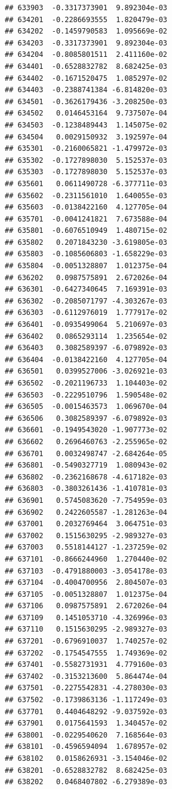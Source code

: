 \documentclass[ignorenonframetext,]{beamer}
\begin{document}
\begin{frame}[fragile]
\begin{verbatim}
## 633903  -0.3317373901  9.892304e-03
## 634201  -0.2286693555  1.820479e-03
## 634202  -0.1459790583  1.095669e-02
## 634203  -0.3317373901  9.892304e-03
## 634204  -0.8085801511  2.411160e-02
## 634401  -0.6528832782  8.682425e-03
## 634402  -0.1671520475  1.085297e-02
## 634403  -0.2388741384 -6.814820e-03
## 634501  -0.3626179436 -3.208250e-03
## 634502   0.0146453164  9.737507e-04
## 634503  -0.1238489443  1.145075e-02
## 634504   0.0029150932  3.192597e-04
## 635301  -0.2160065821 -1.479972e-03
## 635302  -0.1727898030  5.152537e-03
## 635303  -0.1727898030  5.152537e-03
## 635601   0.0611490728 -6.377711e-03
## 635602  -0.2311561010  1.640055e-03
## 635603  -0.0138422160  4.127705e-04
## 635701  -0.0041241821  7.673588e-04
## 635801  -0.6076510949  1.480715e-02
## 635802   0.2071843230 -3.619805e-03
## 635803  -0.1085606803 -1.658229e-03
## 635804  -0.0051328807  1.012375e-04
## 636202   0.0987575891  2.672026e-04
## 636301  -0.6427340645  7.169391e-03
## 636302  -0.2085071797 -4.303267e-03
## 636303  -0.6112976019  1.777917e-02
## 636401  -0.0935499064  5.210697e-03
## 636402   0.0865293114  1.235654e-02
## 636403   0.3082589397 -6.079892e-03
## 636404  -0.0138422160  4.127705e-04
## 636501   0.0399527006 -3.026921e-03
## 636502  -0.2021196733  1.104403e-02
## 636503  -0.2229510796  1.590548e-02
## 636505  -0.0015463573  1.069670e-04
## 636506   0.3082589397 -6.079892e-03
## 636601  -0.1949543020 -1.907773e-02
## 636602   0.2696460763 -2.255965e-02
## 636701   0.0032498747 -2.684264e-05
## 636801  -0.5490327719  1.080943e-02
## 636802  -0.2362168678 -4.617182e-03
## 636803  -0.3803261436 -1.410781e-03
## 636901   0.5745083620 -7.754959e-03
## 636902   0.2422605587 -1.281263e-04
## 637001   0.2032769464  3.064751e-03
## 637002   0.1515630295 -2.989327e-03
## 637003   0.5518144127 -1.237259e-02
## 637101  -0.8666244960  1.270440e-02
## 637103  -0.4791880003 -3.054178e-03
## 637104  -0.4004700956  2.804507e-03
## 637105  -0.0051328807  1.012375e-04
## 637106   0.0987575891  2.672026e-04
## 637109   0.1451053710 -4.326996e-03
## 637110   0.1515630295 -2.989327e-03
## 637201  -0.6796910037  1.740257e-02
## 637202  -0.1754547555  1.749369e-02
## 637401  -0.5582731931  4.779160e-03
## 637402  -0.3153213600  5.864474e-04
## 637501  -0.2275542831 -4.278030e-03
## 637502  -0.1739863136 -1.117249e-03
## 637701   0.4404648292 -9.037592e-03
## 637901   0.0175641593  1.340457e-02
## 638001  -0.0229540620  7.168564e-03
## 638101  -0.4596594094  1.678957e-02
## 638102   0.0158626931 -3.154046e-02
## 638201  -0.6528832782  8.682425e-03
## 638202   0.0468407802 -6.279389e-03

\end{verbatim}
\end{frame}
\end{document}
